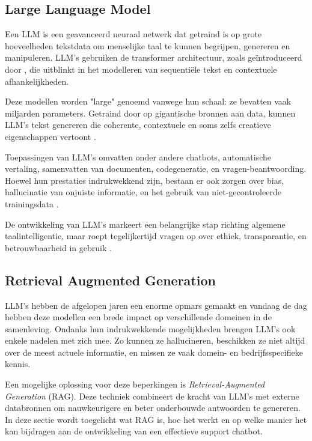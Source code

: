     \subsection{Large Language Model}
    
     Een LLM is een geavanceerd neuraal netwerk dat getraind is op grote hoeveelheden tekstdata om menselijke taal te kunnen begrijpen, genereren en manipuleren. LLM's gebruiken de transformer architectuur, zoals geïntroduceerd door \textcite{Vaswani2017}, die uitblinkt in het modelleren van sequentiële tekst en contextuele afhankelijkheden.
      
     Deze modellen worden "large" genoemd vanwege hun schaal: ze bevatten vaak miljarden parameters. Getraind door op gigantische bronnen aan data, kunnen LLM's tekst genereren die coherente, contextuele en soms zelfs creatieve eigenschappen vertoont \cite{Gupta2025}.
      
     Toepassingen van LLM's omvatten onder andere chatbots, automatische vertaling, samenvatten van documenten, codegeneratie, en vragen-beantwoording. Hoewel hun prestaties indrukwekkend zijn, bestaan er ook zorgen over bias, hallucinatie van onjuiste informatie, en het gebruik van niet-gecontroleerde trainingsdata \cite{Gupta2025}.
      
     De ontwikkeling van LLM’s markeert een belangrijke stap richting algemene taalintelligentie, maar roept tegelijkertijd vragen op over ethiek, transparantie, en betrouwbaarheid in gebruik \cite{Gupta2025}.
     
    \subsection{Retrieval Augmented Generation}
    
    LLM's hebben de afgelopen jaren een enorme opmars gemaakt en vandaag de dag hebben deze modellen een brede impact op verschillende domeinen in de samenleving. Ondanks hun indrukwekkende mogelijkheden brengen LLM’s ook enkele nadelen met zich mee. Zo kunnen ze hallucineren, beschikken ze niet altijd over de meest actuele informatie, en missen ze vaak domein- en bedrijfsspecifieke kennis.  
    
    Een mogelijke oplossing voor deze beperkingen is \textit{Retrieval-Augmented Generation} (RAG). Deze techniek combineert de kracht van LLM’s met externe databronnen om nauwkeurigere en beter onderbouwde antwoorden te genereren. In deze sectie wordt toegelicht wat RAG is, hoe het werkt en op welke manier het kan bijdragen aan de ontwikkeling van een effectieve support chatbot.
    

